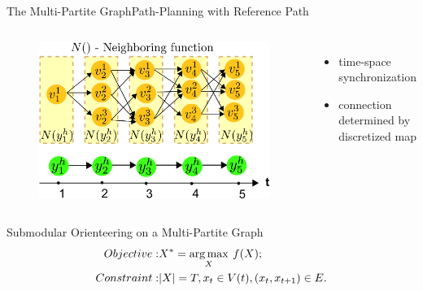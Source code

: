 \begin{frame}{The Multi-Partite Graph}{Path-Planning with Reference Path}

\begin{columns}

\begin{minipage}[c]{\textwidth}
\begin{figure}
\centering
\includegraphics[width = .8\textwidth]{./figure/MultiPartite}
\end{figure}
\end{minipage}

\begin{minipage}[c]{\textwidth}
\begin{itemize}
\item time-space synchronization
\item connection determined by discretized map
\end{itemize}
\end{minipage}

\end{columns}

\begin{block}{Submodular Orienteering on a Multi-Partite Graph}
\begin{equation}
\nonumber
\begin{aligned}
Objective: & X^{*} = \operatorname*{arg\,max}_{X} \: f(X); \\
Constraint: & |X| = T, x_{t} \in V(t), (x_{t}, x_{t+1}) \in E.
\end{aligned}
\end{equation}
\end{block}

\end{frame}

